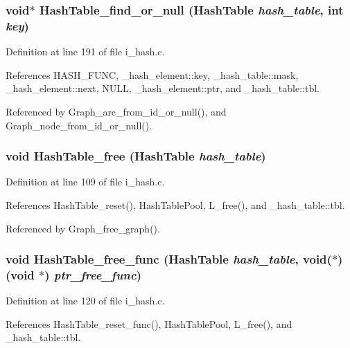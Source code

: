 \subsubsection{\setlength{\rightskip}{0pt plus 5cm}void$\ast$ Hash\-Table\_\-find\_\-or\_\-null (\bf{Hash\-Table} {\em hash\_\-table}, int {\em key})}\label{i__hash_8h_08585a8f2a9e0291220a7fc41739060d}




Definition at line 191 of file i\_\-hash.c.

References HASH\_\-FUNC, \_\-hash\_\-element::key, \_\-hash\_\-table::mask, \_\-hash\_\-element::next, NULL, \_\-hash\_\-element::ptr, and \_\-hash\_\-table::tbl.

Referenced by Graph\_\-arc\_\-from\_\-id\_\-or\_\-null(), and Graph\_\-node\_\-from\_\-id\_\-or\_\-null().
\subsubsection{\setlength{\rightskip}{0pt plus 5cm}void Hash\-Table\_\-free (\bf{Hash\-Table} {\em hash\_\-table})}\label{i__hash_8h_cc9ab22eb7e09aca78cbe0188a4b7122}




Definition at line 109 of file i\_\-hash.c.

References Hash\-Table\_\-reset(), Hash\-Table\-Pool, L\_\-free(), and \_\-hash\_\-table::tbl.

Referenced by Graph\_\-free\_\-graph().
\subsubsection{\setlength{\rightskip}{0pt plus 5cm}void Hash\-Table\_\-free\_\-func (\bf{Hash\-Table} {\em hash\_\-table}, void($\ast$)(void $\ast$) {\em ptr\_\-free\_\-func})}\label{i__hash_8h_6d092f1a97c02895a48a10d19abd7493}




Definition at line 120 of file i\_\-hash.c.

References Hash\-Table\_\-reset\_\-func(), Hash\-Table\-Pool, L\_\-free(), and \_\-hash\_\-table::tbl.
